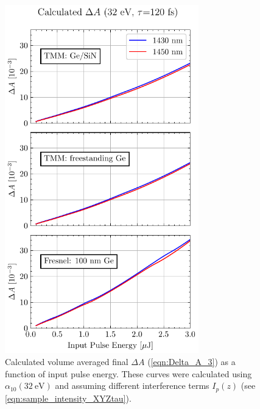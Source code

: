 \begin{figure}
	\centering
	\includegraphics[width=0.75\textwidth]{figures/chap4/FVA_XUV_signal.pdf}
	\caption{Calculated volume averaged final $\Delta A$ (\cref{eqn:Delta_A_3}) as a function of input pulse energy. These curves were calculated using $\alpha_{10}(32 \ \textrm{eV})$ and assuming different interference terms $I_p(z)$ (see \cref{eqn:sample_intensity_XYZtau}).}
	\label{fig:FVA_XUV_signal}
\end{figure}

